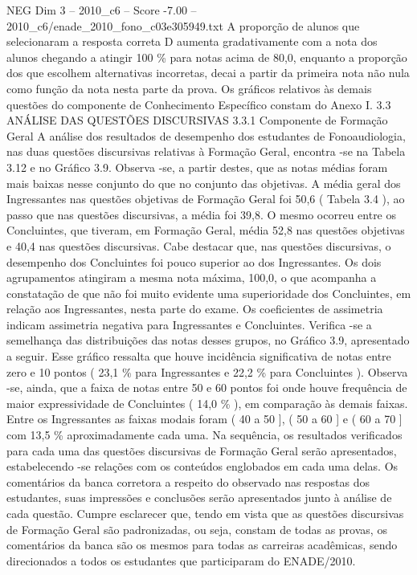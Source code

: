 \begin{textsample}{NEG Dim 3 – 2010\_c6 – Score -7.00 – 2010\_c6/enade\_2010\_fono\_c03e305949.txt}
A proporção de alunos que selecionaram a resposta correta D aumenta gradativamente com a nota dos alunos chegando a atingir 100 \% para notas acima de 80,0, enquanto a proporção dos que escolhem alternativas incorretas, decai a partir da primeira nota não nula como função da nota nesta parte da prova.
Os gráficos relativos às demais questões do componente de Conhecimento Específico constam do Anexo I. 3.3 ANÁLISE DAS QUESTÕES DISCURSIVAS 3.3.1 Componente de Formação Geral A análise dos resultados de desempenho dos estudantes de Fonoaudiologia, nas duas questões discursivas relativas à Formação Geral, encontra -se na Tabela 3.12 e no Gráfico 3.9.
Observa -se, a partir destes, que as notas médias foram mais baixas nesse conjunto do que no conjunto das objetivas.
A média geral dos Ingressantes nas questões objetivas de Formação Geral foi 50,6 ( Tabela 3.4 ), ao passo que nas questões discursivas, a média foi 39,8.
O mesmo ocorreu entre os Concluintes, que tiveram, em Formação Geral, média 52,8 nas questões objetivas e 40,4 nas questões discursivas.
Cabe destacar que, nas questões discursivas, o desempenho dos Concluintes foi pouco superior ao dos Ingressantes.
Os dois agrupamentos atingiram a mesma nota máxima, 100,0, o que acompanha a constatação de que não foi muito evidente uma superioridade dos Concluintes, em relação aos Ingressantes, nesta parte do exame.
Os coeficientes de assimetria indicam assimetria negativa para Ingressantes e Concluintes.
Verifica -se a semelhança das distribuições das notas desses grupos, no Gráfico 3.9, apresentado a seguir.
Esse gráfico ressalta que houve incidência significativa de notas entre zero e 10 pontos ( 23,1 \% para Ingressantes e 22,2 \% para Concluintes ).
Observa -se, ainda, que a faixa de notas entre 50 e 60 pontos foi onde houve frequência de maior expressividade de Concluintes ( 14,0 \% ), em comparação às demais faixas.
Entre os Ingressantes as faixas modais foram ( 40 a 50 ], ( 50 a 60 ] e ( 60 a 70 ] com 13,5 \% aproximadamente cada uma.
Na sequência, os resultados verificados para cada uma das questões discursivas de Formação Geral serão apresentados, estabelecendo -se relações com os conteúdos englobados em cada uma delas.
Os comentários da banca corretora a respeito do observado nas respostas dos estudantes, suas impressões e conclusões serão apresentados junto à análise de cada questão.
Cumpre esclarecer que, tendo em vista que as questões discursivas de Formação Geral são padronizadas, ou seja, constam de todas as provas, os comentários da banca são os mesmos para todas as carreiras acadêmicas, sendo direcionados a todos os estudantes que participaram do ENADE/2010.

\end{textsample}
